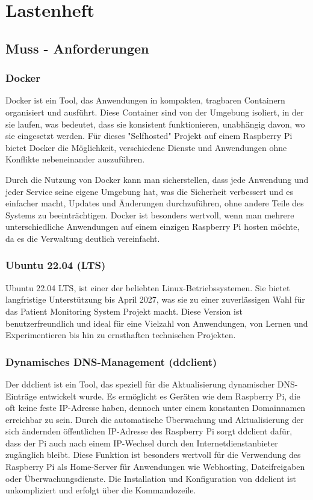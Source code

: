 
\section{Lastenheft}

\subsection{Muss - Anforderungen}

\subsubsection{Docker}
Docker ist ein Tool, das Anwendungen in kompakten, tragbaren Containern organisiert und ausführt. Diese Container sind von der Umgebung isoliert, in der sie laufen, was bedeutet, dass sie konsistent funktionieren, unabhängig davon, wo sie eingesetzt werden. Für dieses "Selfhosted" Projekt auf einem Raspberry Pi bietet Docker die Möglichkeit, verschiedene Dienste und Anwendungen ohne Konflikte nebeneinander auszuführen.

Durch die Nutzung von Docker kann man sicherstellen, dass jede Anwendung und jeder Service seine eigene Umgebung hat, was die Sicherheit verbessert und es einfacher macht, Updates und Änderungen durchzuführen, ohne andere Teile des Systems zu beeinträchtigen. Docker ist besonders wertvoll, wenn man mehrere unterschiedliche Anwendungen auf einem einzigen Raspberry Pi hosten möchte, da es die Verwaltung deutlich vereinfacht.\cite{Docker}

\subsubsection{Ubuntu 22.04 (LTS)}
Ubuntu 22.04 LTS, ist einer der beliebten Linux-Betriebssystemen. Sie bietet langfristige Unterstützung bis April 2027, was sie zu einer zuverlässigen Wahl für das Patient Monitoring System Projekt macht. Diese Version ist benutzerfreundlich und ideal für eine Vielzahl von Anwendungen, von Lernen und Experimentieren bis hin zu ernsthaften technischen Projekten. \cite{ubuntu}

\subsubsection{Dynamisches DNS-Management (ddclient)}
Der ddclient ist ein Tool, das speziell für die Aktualisierung dynamischer DNS-Einträge entwickelt wurde. Es ermöglicht es Geräten wie dem Raspberry Pi, die oft keine feste IP-Adresse haben, dennoch unter einem konstanten Domainnamen erreichbar zu sein. Durch die automatische Überwachung und Aktualisierung der sich ändernden öffentlichen IP-Adresse des Raspberry Pi sorgt ddclient dafür, dass der Pi auch nach einem IP-Wechsel durch den Internetdienstanbieter zugänglich bleibt. Diese Funktion ist besonders wertvoll für die Verwendung des Raspberry Pi als Home-Server für Anwendungen wie Webhosting, Dateifreigaben oder Überwachungsdienste. Die Installation und Konfiguration von ddclient ist unkompliziert und erfolgt über die Kommandozeile. \cite{ddclient}

